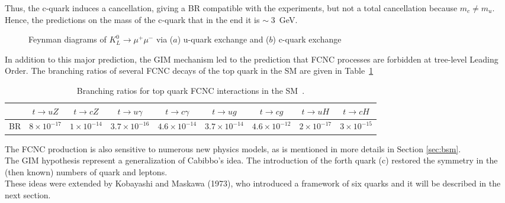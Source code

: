 Thus, the c-quark induces a cancellation, giving a BR compatible with the experiments, but not a total cancellation because $m_{c}\neq m_{u}$. Hence, the predictions on the mass of the
c-quark that in the end it is $\sim\; 3$~GeV.
\begin{figure}[h]
	\centering
		\qquad
	\caption{Feynman diagrams of $K^{0}_{L}\rightarrow \mu^{+} \mu^{-}$ via ($a$) u-quark exchange and ($b$) c-quark exchange}
\end{figure}
In addition to this major prediction, the GIM mechanism led to the prediction that FCNC processes are forbidden at tree-level Leading Order. The branching ratios of several FCNC decays of the top quark in the SM are given in Table~\ref{tab:SM_BR}
\begin{table}[h]
	\begin{adjustbox}{max width=1.\textwidth,center}
		\begin{tabular}{|c|c|c|c|c|c|c|c|c|}
		\hline 
  & $ t\rightarrow uZ$    & $ t\rightarrow cZ$    & $ t\rightarrow u\gamma$ & $ t\rightarrow c\gamma$ & $ t\rightarrow ug$       & $ t\rightarrow cg$       & $ t\rightarrow uH$     & $ t\rightarrow cH$  \\ 
	\hline 
	BR & $8\times 10^{-17} $ & $1\times 10^{-14} $ & $3.7\times 10^{-16} $       & $4.6\times 10^{-14} $      & $3.7\times 10^{-14} $  & $4.6\times 10^{-12} $ & $2\times 10^{-17} $  &$3\times 10^{-15} $  \\ 
		\hline 
		\end{tabular} 
	\end{adjustbox}
\caption{Branching ratios for top quark FCNC interactions in the SM~\cite{aguilar}.}
\label{tab:SM_BR}
\end{table}
\noindent The FCNC production is also sensitive to numerous new physics models, as is mentioned in more details in Section \ref{sec:bsm}.\\
The GIM hypothesis represent a generalization of Cabibbo's idea. The introduction of the forth quark (c) restored the symmetry
in the (then known)  numbers of quark and leptons.\\
These ideas were extended by Kobayashi and Maskawa (1973), who introduced a framework of six quarks and it will be described in the next section.

